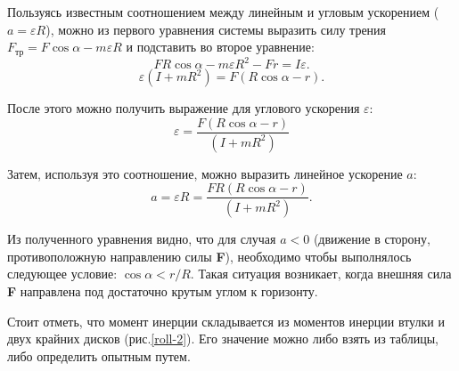 \documentclass[14pt,a4paper,oneside]{extarticle}	%
\begin{document}
Пользуясь известным соотношением между линейным и угловым ускорением ($ a = \varepsilon R $), можно из первого уравнения системы выразить силу трения $  F_{\text{тр}} = F\cos\alpha - m  \varepsilon R $ и подставить во второе уравнение:
\begin{equation}\label{roll-eq3}
F R \cos\alpha - m  \varepsilon R^{2} - Fr= I \varepsilon.
\end{equation}
\begin{equation}\label{roll-eq4}
 \varepsilon (I  + mR^{2})  = F (R \cos \alpha - r).
\end{equation}

После этого можно получить выражение для углового ускорения $ \varepsilon $:
\begin{equation}\label{roll-eq5}
\varepsilon = \frac{F(R \cos \alpha - r)}{(I  + mR^{2})}
\end{equation}

Затем, используя это соотношение, можно выразить линейное ускорение $ a $:
\begin{equation}\label{roll-eq6}
a = \varepsilon R = \frac{FR(R \cos \alpha - r)}{(I + mR^{2})}.
\end{equation}

Из полученного уравнения видно, что для случая $ a<0 $ (движение в сторону, противоположную направлению силы \textbf{F}), необходимо чтобы выполнялось следующее условие: $ \cos \alpha < r/R$. Такая ситуация возникает, когда внешняя сила \textbf{F} направлена под достаточно крутым углом к горизонту.

Стоит отметь, что момент инерции складывается из моментов инерции втулки и двух крайних дисков (рис.\ref{roll-2}).
Его значение можно либо взять из таблицы, либо определить опытным путем.  
\end{document}
